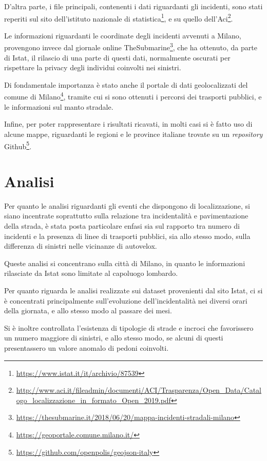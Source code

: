 \documentclass[a4paper]{article}
\newcommand{\skipline}{\vspace{0.2in}}
\begin{document}
D'altra parte, i file principali, contenenti i dati riguardanti gli incidenti, sono 
stati reperiti sul sito 
dell'istituto nazionale di statistica\footnote{\url{https://www.istat.it/it/archivio/87539}}, 
e su quello dell'Aci\footnote{\url{http://www.aci.it/fileadmin/documenti/ACI/Trasparenza/Open_Data/Catalogo_localizzazione_in_formato_Open_2019.pdf}}. 

Le informazioni riguardanti le coordinate degli incidenti avvenuti a Milano, 
provengono invece dal giornale online 
TheSubmarine\footnote{\url{https://thesubmarine.it/2018/06/20/mappa-incidenti-stradali-milano}}, 
che ha ottenuto, da parte di Istat, il rilascio di una parte di questi dati, 
normalmente oscurati per rispettare la privacy degli individui coinvolti nei sinistri. 


Di fondamentale importanza è stato anche il portale di dati geolocalizzati del comune di 
Milano\footnote{\url{https://geoportale.comune.milano.it/}}, 
tramite cui si sono ottenuti i percorsi dei trasporti pubblici, e le 
informazioni sul manto stradale.

Infine, per poter rappresentare i risultati ricavati, in molti casi si è fatto uso di 
alcune mappe, riguardanti le regioni e le province italiane trovate su un \textit{repository} 
Github\footnote{\url{https://github.com/openpolis/geojson-italy}}.

\section{Analisi}

Per quanto le analisi riguardanti gli eventi che dispongono di localizzazione, 
si siano incentrate soprattutto sulla relazione tra incidentalità e pavimentazione 
della strada, è stata posta particolare enfasi sia sul rapporto tra numero di 
incidenti e la presenza di linee di trasporti pubblici, sia 
allo stesso modo, sulla differenza di sinistri nelle vicinanze di autovelox. 

Queste analisi si concentrano sulla città di Milano, in quanto le informazioni rilasciate da 
Istat sono limitate al capoluogo lombardo.

\skipline
Per quanto riguarda le analisi realizzate sui dataset provenienti dal sito Istat, 
ci si è concentrati principalmente sull'evoluzione dell'incidentalità nei diversi orari 
della giornata, e allo stesso modo al passare dei mesi. 

Si è inoltre controllata l'esistenza di tipologie di strade e incroci che favorissero 
un numero maggiore di sinistri, e allo stesso modo, se alcuni di questi presentassero 
un valore anomalo di pedoni coinvolti. 
\end{document}
